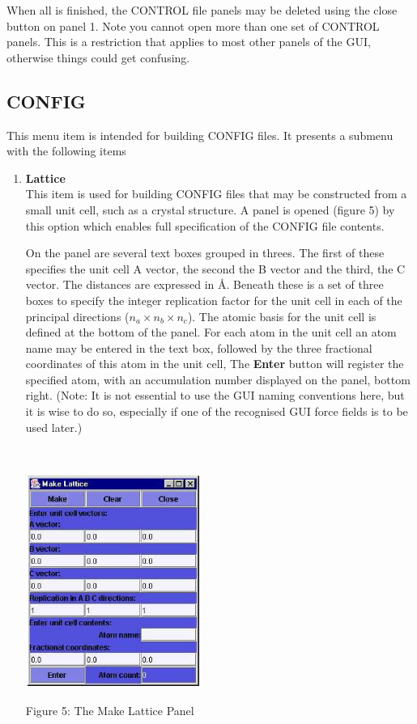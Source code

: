 When all is finished, the CONTROL file panels may be deleted using the
close button on panel 1. Note you cannot open more than one set of
CONTROL panels. This is a restriction that applies to most
other panels of the GUI, otherwise things could get confusing.

\subsection{CONFIG}

This menu item is intended for building \DD{} CONFIG files. It presents
a submenu with the following items
\begin{enumerate}
\item {\bf Lattice}\\
This item is used for building CONFIG files that may be constructed
from a small unit cell, such as a crystal structure. A panel is opened
(figure 5) by this option which enables full specification of the CONFIG file
contents.

On the panel are several text boxes grouped in threes. The
first of these specifies the unit cell A vector, the second the B
vector and the third, the C vector. The distances are expressed in
\AA. Beneath these is a set of three boxes to specify the integer 
replication factor for the unit cell in each of the principal
directions ($n_a\times n_b\times n_c$).  The atomic basis for the unit
cell is defined at the bottom of the panel. For each atom in the unit
cell an atom name may be entered in the text box, followed by the
three fractional coordinates of this atom in the unit cell, The {\bf
Enter} button will register the specified atom, with an accumulation
number displayed on the panel, bottom right. (Note: It is not
essential to use the GUI naming conventions here, but it is wise to do
so, especially if one of the recognised GUI force fields is to be used
later.)


~

\vskip 5mm
\centerline{\includegraphics[height=7cm]{lattice.ps}}
\centerline{Figure 5: The Make Lattice Panel}
\vskip 5mm


\end{enumerate}
